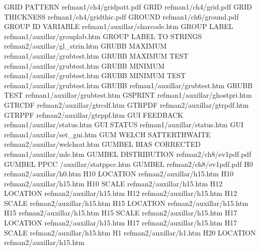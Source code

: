 GRID PATTERN                            refman1/ch4/gridpatt.pdf
GRID                                    refman1/ch4/grid.pdf
GRID THICKNESS                          refman1/ch4/gridthic.pdf
GROUND                                  refman1/ch6/ground.pdf
GROUP ID VARIABLE                       refman1/auxillar/charcode.htm
GROUP LABEL                             refman1/auxillar/grouplab.htm
GROUP LABEL TO STRINGS                  refman2/auxillar/gl_strin.htm
GRUBB MAXIMUM                           refman1/auxillar/grubtest.htm
GRUBB MAXIMUM TEST                      refman1/auxillar/grubtest.htm
GRUBB MINIMUM                           refman1/auxillar/grubtest.htm
GRUBB MINIMUM TEST                      refman1/auxillar/grubtest.htm
GRUBB                                   refman1/auxillar/grubtest.htm
GRUBB TEST                              refman1/auxillar/grubtest.htm
GSPRINT                                 refman1/auxillar/ghostpri.htm
GTRCDF                                  refman2/auxillar/gtrcdf.htm
GTRPDF                                  refman2/auxillar/gtrpdf.htm
GTRPPF                                  refman2/auxillar/gtrppf.htm
GUI FEEDBACK                            refman1/auxillar/status.htm
GUI STATUS                              refman1/auxillar/status.htm
GUI                                     refman1/auxillar/set_gui.htm
GUM WELCH SATTERTHWAITE                 refman2/auxillar/welchsat.htm
GUMBEL BIAS CORRECTED                   refman1/auxillar/mle.htm
GUMBEL DISTRIBUTION                     refman2/ch8/ev1pdf.pdf
GUMBEL PPCC                             /auxillar/statppcc.htm
GUMBEL                                  refman2/ch8/ev1pdf.pdf
H0                                      refman2/auxillar/h0.htm
H10 LOCATION                            refman2/auxillar/h15.htm
H10                                     refman2/auxillar/h15.htm
H10 SCALE                               refman2/auxillar/h15.htm
H12 LOCATION                            refman2/auxillar/h15.htm
H12                                     refman2/auxillar/h15.htm
H12 SCALE                               refman2/auxillar/h15.htm
H15 LOCATION                            refman2/auxillar/h15.htm
H15                                     refman2/auxillar/h15.htm
H15 SCALE                               refman2/auxillar/h15.htm
H17 LOCATION                            refman2/auxillar/h15.htm
H17                                     refman2/auxillar/h15.htm
H17 SCALE                               refman2/auxillar/h15.htm
H1                                      refman2/auxillar/h1.htm
H20 LOCATION                            refman2/auxillar/h15.htm
